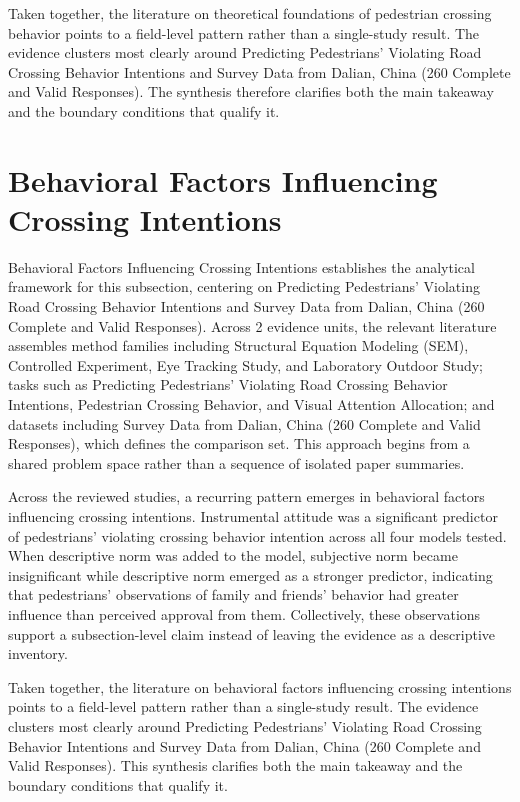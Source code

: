 \documentclass{article}
\begin{document}
Taken together, the literature on theoretical foundations of pedestrian crossing behavior points to a field-level pattern rather than a single-study result. The evidence clusters most clearly around Predicting Pedestrians' Violating Road Crossing Behavior Intentions and Survey Data from Dalian, China (260 Complete and Valid Responses). The synthesis therefore clarifies both the main takeaway and the boundary conditions that qualify it. \cite{08_2016_zhou_aap,09_2018_jiang_aap}

\section{Behavioral Factors Influencing Crossing Intentions}
Behavioral Factors Influencing Crossing Intentions establishes the analytical framework for this subsection, centering on Predicting Pedestrians' Violating Road Crossing Behavior Intentions and Survey Data from Dalian, China (260 Complete and Valid Responses). Across 2 evidence units, the relevant literature assembles method families including Structural Equation Modeling (SEM), Controlled Experiment, Eye Tracking Study, and Laboratory Outdoor Study; tasks such as Predicting Pedestrians' Violating Road Crossing Behavior Intentions, Pedestrian Crossing Behavior, and Visual Attention Allocation; and datasets including Survey Data from Dalian, China (260 Complete and Valid Responses), which defines the comparison set. This approach begins from a shared problem space rather than a sequence of isolated paper summaries. \cite{08_2016_zhou_aap,09_2018_jiang_aap}

Across the reviewed studies, a recurring pattern emerges in behavioral factors influencing crossing intentions. Instrumental attitude was a significant predictor of pedestrians' violating crossing behavior intention across all four models tested. When descriptive norm was added to the model, subjective norm became insignificant while descriptive norm emerged as a stronger predictor, indicating that pedestrians' observations of family and friends' behavior had greater influence than perceived approval from them. Collectively, these observations support a subsection-level claim instead of leaving the evidence as a descriptive inventory. \cite{08_2016_zhou_aap,09_2018_jiang_aap}

Taken together, the literature on behavioral factors influencing crossing intentions points to a field-level pattern rather than a single-study result. The evidence clusters most clearly around Predicting Pedestrians' Violating Road Crossing Behavior Intentions and Survey Data from Dalian, China (260 Complete and Valid Responses). This synthesis clarifies both the main takeaway and the boundary conditions that qualify it. \cite{08_2016_zhou_aap,09_2018_jiang_aap}
\end{document}
